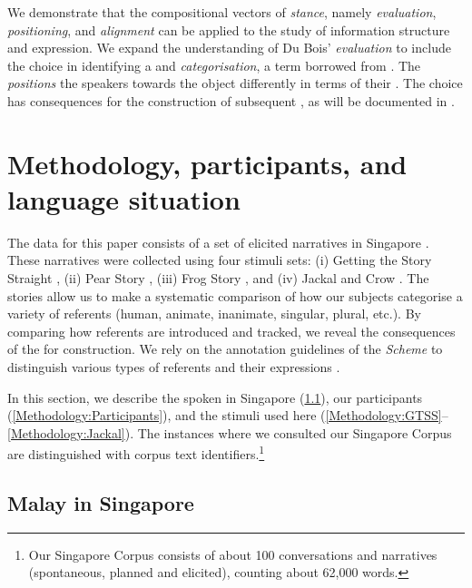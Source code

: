 \documentclass[output=paper
,modfonts
,nonflat]{langsci/langscibook}
\begin{document}
\noindent
We demonstrate that the compositional vectors of \emph{stance}, namely \emph{evaluation}, \emph{positioning}, and \emph{alignment} can be applied to the study of information structure and  expression. We expand the understanding of Du Bois' \emph{evaluation} to include the choice in identifying a  and \emph{ categorisation}, a term borrowed from \cite{Stivers2007}. The  \emph{positions} the speakers towards the object differently in terms of their . The choice has consequences for the construction of subsequent , as will be documented in . 


\section{Methodology, participants, and language situation} 
The data for this paper consists of a set of elicited narratives in Singapore . These narratives were collected using four stimuli sets: (i) Getting the Story Straight \citep{SanRoqueEtAl2012}, (ii) Pear Story \citep{Chafe1980}, (iii) Frog Story \citep{Mayer1969}, and (iv) Jackal and Crow \citep{Carroll2011}. The stories allow us to make a systematic comparison of how our subjects categorise a variety of referents (human, animate, inanimate, singular, plural, etc.). By comparing how referents are introduced and tracked, we reveal the consequences of the  for  construction. We rely on the annotation guidelines of the \emph{ Scheme} to distinguish various types of referents and their expressions \citep{RiesterBaumann2017}. 

In this section, we describe the  spoken in Singapore (\ref{Methodology:SgMalay}), our participants (\ref{Methodology:Participants}), and the stimuli used here (\ref{Methodology:GTSS}--\ref{Methodology:Jackal}). The instances where we consulted our Singapore  Corpus are distinguished with corpus text identifiers.\footnote{Our Singapore  Corpus consists of about 100 conversations and narratives (spontaneous, planned and elicited), counting about 62,000 words.}

\subsection{Malay in Singapore}\label{Methodology:SgMalay}
\end{document}
